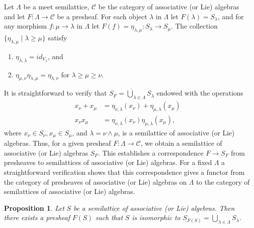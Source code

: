 \documentclass[10pt,a4paper]{amsart}
\newtheorem{prop}[thm]{Proposition}
\theoremstyle{definition}
\theoremstyle{remark}
\numberwithin{equation}{section}
\newtheorem*{Theorem A}{\textbf{Theorem A}}
\newtheorem*{Corollary E}{\textbf{Corollary E}}
\newtheorem*{Corollary F}{\textbf{Corollary F}}
\newtheorem*{Theorem B}{\textbf{Theorem B}}
\newtheorem*{Theorem C}{\textbf{Theorem C}}
\newtheorem*{Theorem D}{\textbf{Theorem B}}
\newtheorem*{p a}{\textbf{Proof of  Theorem A}}
\newtheorem*{p b}{\textbf{Proof of Theorem B}}
\newtheorem*{p c}{\textbf{Proof of  Theorem C}}
\newtheorem*{p d}{\textbf{Proof of  Theorem D}}
\newcommand{\0}{{\vartheta}}
\begin{document}
Let $\Lambda$ be a meet semilattice,  $\mathcal{C}$ be the  category of associative (or Lie)  algebras 
and let $F: \Lambda\to \mathcal{C}$ be a presheaf. For each object $\lambda$ in $\Lambda$ let $F(\lambda)=S_\lambda$, and for any morphism  $f:\mu\to \lambda$ in $\Lambda$ let $F(f)=\eta_{\lambda,\mu}: S_\lambda\to S_\mu$. The collection $\{\eta_{\lambda,\mu}\mid \lambda\geq \mu\}$ satisfy 
\begin{enumerate}
    \item $\eta_{\lambda,\lambda}=id_{V_{\lambda}}$, and
    \item $ \eta_{\mu,\nu} \eta_{\lambda,\mu}= \eta_{\lambda,\nu}$ for $\lambda \geq\mu \geq \nu$.
\end{enumerate}
It is straightforward to verify that 
$S_F=\dot{\bigcup}_{\lambda\in \Lambda} S_{\lambda}$ endowed with the operations
    \begin{align*}
      x_{\nu}+x_{\mu}&=\eta_{\nu,\lambda}(x_{\nu})+ \eta_{\mu,\lambda}(x_{\mu})\\
      x_{\nu}x_{\mu}&=\eta_{\nu,\lambda}(x_{\nu})\eta_{\mu,\lambda}(x_{\mu}),
         \end{align*}
where $x_\nu\in S_\nu, x_\mu\in S_\mu$, and $\lambda=\nu\wedge\mu$, is a semilattice of 
  associative (or Lie) algebras.  Thus, for a given presheaf $F:\Lambda\to \mathcal{C}$, we obtain a semilattice of associative (or Lie) algebras $S_F.$  This establishes a correspondence $F\to S_F$ from presheaves to  semilattices of associative (or Lie) algebras. For a fixed $\Lambda$ a straightforward verification shows that this correspondence gives a functor from the category of presheaves of associative (or Lie) algebras on  $\Lambda $  to the category of semilattices of associative (or Lie) algebras. 
    

\begin{prop}\label{prop-semila}
 Let $S$ be a semilattice of  associative (or Lie) algebras. Then there exists a presheaf $F(S)$ such that $S$ is isomorphic to $S_{F(S)}=\dot{\bigcup}_{\lambda\in \Lambda}  S_{\lambda}$. 
\end{prop}
\end{document}
